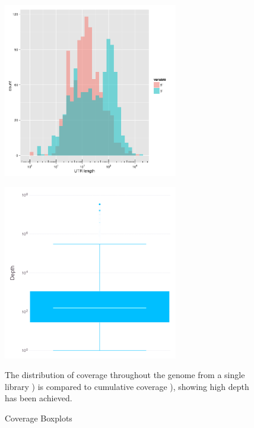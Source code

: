 \begin{figure}
\begin{center}
\begin{minipage}{.5\textwidth}
\begin{center}
{\includegraphics[width=\linewidth,height=3in]{images/Assembly/Summary/futrlength.png}}
\label{fig:5a}
\end{center}
\end{minipage}%
\begin{minipage}{.5\textwidth}
\begin{center}
{\includegraphics[width=\linewidth,height=3in]{images/Sequencing/Cumulative_depth_boxplot.png}}
\label{fig:5b}
\end{center}
\end{minipage}
\end{center}
\caption{Coverage Boxplots}
The distribution of coverage throughout the genome from a single library ) is compared to cumulative coverage ), showing high depth has been achieved.
\end{figure}


